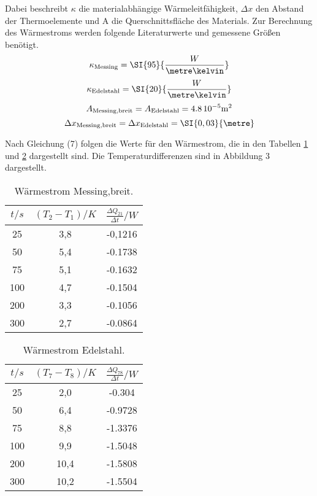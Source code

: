 Dabei beschreibt $\kappa$ die materialabhängige Wärmeleitfähigkeit, $\Delta x$ den Abstand der Thermoelemente und A die Querschnittsfläche des Materials.
Zur Berechnung des Wärmestroms werden folgende Literaturwerte und gemessene Größen benötigt.
\begin{equation}
    \kappa_\text{Messing} = \SI{95}{\frac{W}{\metre\kelvin}}    \notag
\end{equation}
\begin{equation}
    \kappa_\text{Edelstahl} = \SI{20}{\frac{W}{\metre\kelvin}}  \notag
\end{equation}
\begin{equation}
    A_\text{Messing,breit} = A_\text{Edelstahl} = \SI{4,8}{10^{-5}m^2}   \notag
\end{equation}
\begin{equation}
    \Delta x_\text{Messing,breit} = \Delta x_\text{Edelstahl} = \SI{0,03}{\metre}    \notag
\end{equation}

Nach Gleichung (7) folgen die Werte für den Wärmestrom, die in den Tabellen \ref{tab:a} und \ref{tab:b} dargestellt sind.
Die Temperaturdifferenzen sind in Abbildung 3 dargestellt.


\begin{table}[H]
    \begin{center}
      \caption{Wärmestrom Messing,breit.}
      \label{tab:a}
      \begin{tabular}{c|c|c} 
        \textbf{$t / s$ } & \textbf{$(T_2-T_1) / K$} & \textbf{$\frac{\Delta Q_\text{21}}{\Delta t} / W$}\\
        \hline
        25 & 3,8 &  -0,1216 \\
        50 & 5,4 & -0.1738 \\
        75 & 5,1 & -0.1632 \\
        100 & 4,7 & -0.1504 \\
        200 & 3,3 & -0.1056 \\
        300 & 2,7 &  -0.0864
      \end{tabular}
    \end{center}
\end{table}

\begin{table}[H]
    \begin{center}
      \caption{Wärmestrom Edelstahl.}
      \label{tab:b}
      \begin{tabular}{c|c|c} 
        \textbf{$t / s$ } &  \textbf{$(T_7-T_8) / K$} & \textbf{$\frac{\Delta Q_\text{78}}{\Delta t} / W$}\\
        \hline
        25 & 2,0 & -0.304 \\
        50 & 6,4 & -0.9728 \\
        75 & 8,8 & -1.3376 \\
        100 & 9,9 & -1.5048  \\
        200 & 10,4 & -1.5808 \\
        300 & 10,2 & -1.5504
      \end{tabular}
    \end{center}
\end{table}


